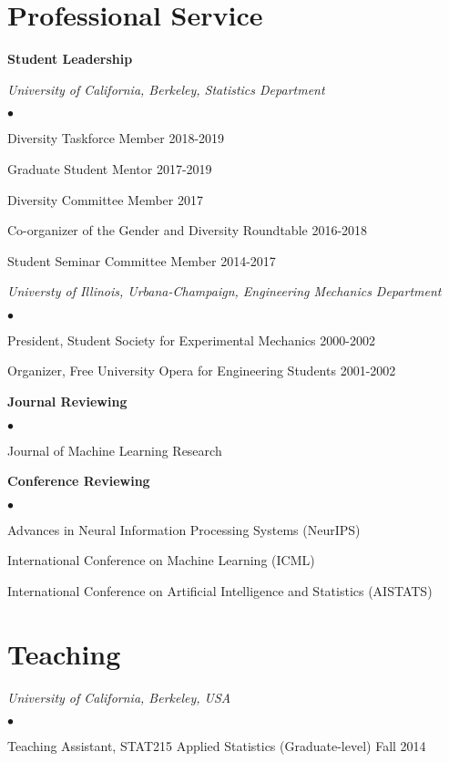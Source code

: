 \documentclass[margin,line]{res}
\newenvironment{list2}{
  \begin{list}{$\bullet$}{%
      \setlength{\itemsep}{0in}
      \setlength{\parsep}{0in} \setlength{\parskip}{0in}
      \setlength{\topsep}{0in} \setlength{\partopsep}{0in}
      \setlength{\leftmargin}{0.2in}}}{\end{list}}
\begin{document}
\begin{resume}
\section{\sc Professional Service}

\textbf{Student Leadership}

{\em University of California, Berkeley, Statistics Department}
\begin{list2}
    \item Diversity Taskforce Member \hfill 2018-2019
    \item Graduate Student Mentor \hfill 2017-2019
    \item Diversity Committee Member  \hfill 2017
    \item Co-organizer of the Gender and Diversity Roundtable \hfill 2016-2018
    \item Student Seminar Committee Member \hfill 2014-2017
\end{list2}

{\em Universty of Illinois, Urbana-Champaign, Engineering Mechanics Department}
\begin{list2}
    \item President, Student Society for Experimental Mechanics \hfill 2000-2002
    \item Organizer, Free University Opera for Engineering Students \hfill 2001-2002
\end{list2}


\textbf{Journal Reviewing}
\begin{list2}
\item Journal of Machine Learning Research
\end{list2}

\textbf{Conference Reviewing}
\begin{list2}
\item Advances in Neural Information Processing Systems (NeurIPS)
\item International Conference on Machine Learning (ICML)
\item International Conference on Artificial Intelligence and Statistics (AISTATS)
\end{list2}


\section{\sc Teaching}

\emph{University of California, Berkeley, USA}
\begin{list2}
\item Teaching Assistant, STAT215 Applied Statistics
(Graduate-level) \hfill Fall 2014
\end{list2}


\end{resume}
\end{document}
